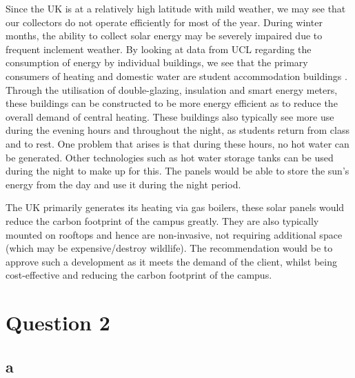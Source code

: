 \documentclass[11pt]{article}
\numberwithin{equation}{section}
\begin{document}
Since the UK is at a relatively high latitude with mild weather, we may see that our collectors do not operate efficiently for most of the year. During winter months, the ability to collect solar energy may be severely impaired due to frequent inclement weather. By looking at data from UCL regarding the consumption of energy by individual buildings, we see that the primary consumers of heating and domestic water are student accommodation buildings \cite{b2}. Through the utilisation of double-glazing, insulation and smart energy meters, these buildings can be constructed to be more energy efficient as to reduce the overall demand of central heating. These buildings also typically see more use during the evening hours and throughout the night, as students return from class and to rest. One problem that arises is that during these hours, no hot water can be generated. Other technologies such as hot water storage tanks can be used during the night to make up for this. The panels would be able to store the sun's energy from the day and use it during the night period. 

The UK primarily generates its heating via gas boilers, these solar panels would reduce the carbon footprint of the campus greatly. They are also typically mounted on rooftops and hence are non-invasive, not requiring additional space (which may be expensive/destroy wildlife). The recommendation would be to approve such a development as it meets the demand of the client, whilst being cost-effective and reducing the carbon footprint of the campus. 
\section{Question 2}
\subsection{a}
\end{document}
